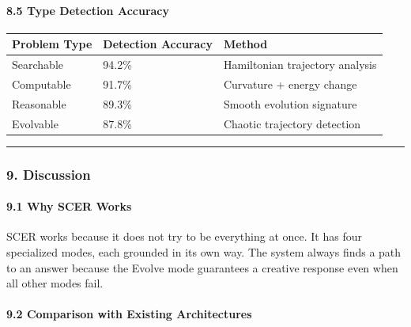 \documentclass[
  11pt,
  a4paper,
]{article}
\begin{document}
\paragraph{8.5 Type Detection Accuracy}\label{type-detection-accuracy}

\begin{longtable}[]{@{}lll@{}}
\toprule\noalign{}
Problem Type & Detection Accuracy & Method \\
\midrule\noalign{}
\endhead
\bottomrule\noalign{}
\endlastfoot
Searchable & 94.2\% & Hamiltonian trajectory analysis \\
Computable & 91.7\% & Curvature + energy change \\
Reasonable & 89.3\% & Smooth evolution signature \\
Evolvable & 87.8\% & Chaotic trajectory detection \\
\end{longtable}

\begin{center}\rule{0.5\linewidth}{0.5pt}\end{center}

\subsubsection{9. Discussion}\label{discussion-3}

\paragraph{9.1 Why SCER Works}\label{why-scer-works}

SCER works because it does not try to be everything at once. It has four
specialized modes, each grounded in its own way. The system always finds
a path to an answer because the Evolve mode guarantees a creative
response even when all other modes fail.

\paragraph{9.2 Comparison with Existing
Architectures}\label{comparison-with-existing-architectures}
\end{document}
